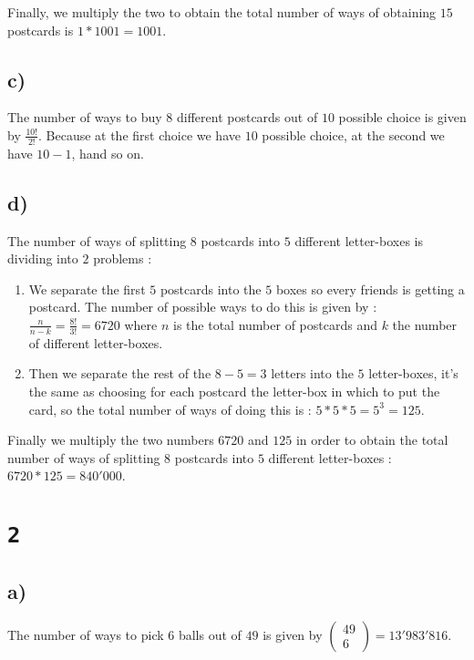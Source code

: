 \documentclass[a4paper,11pt]{report}
\begin{document}
Finally, we multiply the two to obtain the total number of ways of obtaining
$15$ postcards is $1 * 1001 = 1001$.

\subsection*{c)}

The number of ways to buy $8$ different postcards out of $10$ possible choice is
given by $\frac{10!}{2!}$. Because at the first choice we have $10$ possible
choice, at the second we have $10-1$, hand so on.

\subsection*{d)}

The number of ways of splitting $8$ postcards into $5$ different letter-boxes is
dividing into $2$ problems :
\begin{enumerate}
\item We separate the first $5$ postcards into the $5$ boxes so every friends is
  getting a postcard. The number of possible ways to do this is given by :
  $\frac{n}{n-k} = \frac{8!}{3!} = 6720$ where $n$ is the total number of postcards and
  $k$ the number of different letter-boxes.
\item Then we separate the rest of the $8 - 5 = 3$ letters into the $5$
  letter-boxes, it's the same as choosing for each postcard the letter-box in
  which to put the card, so the total number of ways of doing this is : $5 * 5 *
  5 = 5^3 = 125$.
\end{enumerate}

Finally we multiply the two numbers $6720$ and $125$ in order to obtain the
total number of ways of splitting $8$ postcards into $5$ different letter-boxes
: $6720 * 125 = 840'000$.

\section*{\texttt{2}}

\subsection*{a)}

The number of ways to pick $6$ balls out of $49$ is given by $\begin{pmatrix} 49
  \\ 6 \end{pmatrix} = 13'983'816$.
\end{document}
